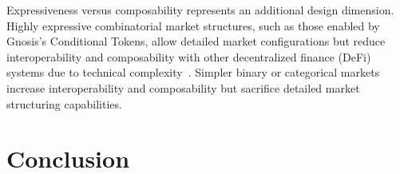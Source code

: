 Expressiveness versus composability represents an additional design dimension. Highly expressive combinatorial market structures, such as those enabled by Gnosis’s Conditional Tokens, allow detailed market configurations but reduce interoperability and composability with other decentralized finance (DeFi) systems due to technical complexity~\cite{Gn17}. Simpler binary or categorical markets increase interoperability and composability but sacrifice detailed market structuring capabilities.


\section{Conclusion} 


